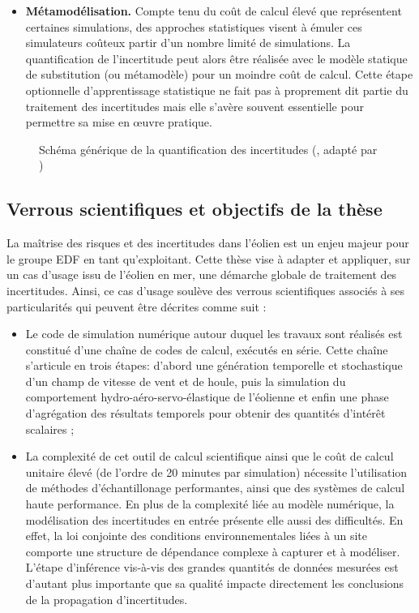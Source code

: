\begin{itemize}
    \item[\textbullet] \textbf{Métamodélisation.} Compte tenu du coût de calcul élevé que représentent certaines simulations, des approches statistiques visent à émuler ces simulateurs coûteux partir d'un nombre limité de simulations. 
    La quantification de l'incertitude peut alors être réalisée avec le modèle statique de substitution (ou métamodèle) pour un moindre coût de calcul. 
    Cette étape optionnelle d'apprentissage statistique ne fait pas à proprement dit partie du traitement des incertitudes mais elle s'avère souvent essentielle pour permettre sa mise en \oe uvre pratique. 
\end{itemize}

\begin{figure}[!h]
    \centering
    
    \caption{Schéma générique de la quantification des incertitudes (\cite{rocquigny_2008}, adapté par \cite{ajenjo_2023})}
    \label{fig:UQ_methodo_FR}
\end{figure}


\subsection*{Verrous scientifiques et objectifs de la thèse}

La maîtrise des risques et des incertitudes dans l'éolien est un enjeu majeur pour le groupe EDF en tant qu'exploitant. 
Cette thèse vise à adapter et appliquer, sur un cas d'usage issu de l'éolien en mer, une démarche globale de traitement des incertitudes. 
Ainsi, ce cas d'usage soulève des verrous scientifiques associés à ses particularités qui peuvent être décrites comme suit :
\begin{itemize}
    \item[\textbullet] Le code de simulation numérique autour duquel les travaux sont réalisés est constitué d'une chaîne de codes de calcul, exécutés en série. 
    Cette chaîne s'articule en trois étapes: d'abord une génération temporelle et stochastique d'un champ de vitesse de vent et de houle, puis la simulation du comportement hydro-aéro-servo-élastique de l'éolienne et enfin une phase d'agrégation des résultats temporels pour obtenir des quantités d'intérêt scalaires ;
    \item[\textbullet] La complexité de cet outil de calcul scientifique ainsi que le coût de calcul unitaire élevé (de l'ordre de 20 minutes par simulation) nécessite l'utilisation de méthodes d'échantillonage performantes, ainsi que des systèmes de calcul haute performance. 
    En plus de la complexité liée au modèle numérique, la modélisation des incertitudes en entrée présente elle aussi des difficultés. 
    En effet, la loi conjointe des conditions environnementales liées à un site comporte une structure de dépendance complexe à capturer et à modéliser. 
    L'étape d'inférence vis-à-vis des grandes quantités de données mesurées est d'autant plus importante que sa qualité impacte directement les conclusions de la propagation d'incertitudes.
\end{itemize}

